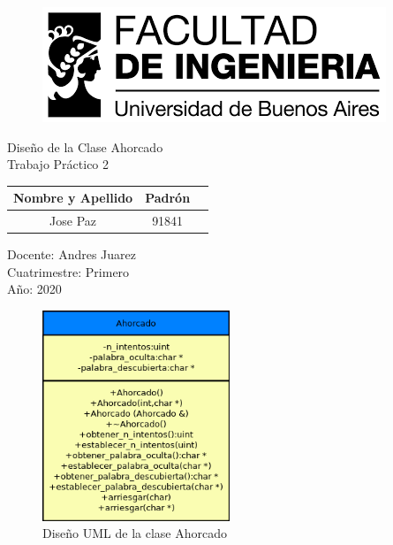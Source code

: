 \documentclass[a4paper,11pt]{article}
\begin{document}
\marginsize{2cm}{2cm}{2cm}{2cm}
\renewcommand\contentsname{Indice}
\renewcommand{\footrulewidth}{0.4pt}
\renewcommand{\headrulewidth}{0.4pt}

\pagestyle{empty}

\begin{figure}
  \centering
    \includegraphics{logo.png}
\end{figure}

\vfill
\vspace{4cm}
\vspace{4cm}
\vspace{4cm}
\begin{center}
	\Huge{Diseño de la Clase Ahorcado}\\
	\Huge{Trabajo Práctico 2}\\
\end{center}
\vspace{4cm}


\begin{center}
	\begin{tabular}{|c|c|c|}
		\hline
		\textbf{Nombre y Apellido}  & \textbf{Padrón}\\
		\hline
		 Jose Paz & 91841   \\
		\hline
	\end{tabular}
\end{center}

\vfill 

\begin{flushleft}
	\Large{Docente: Andres Juarez}\\
	\Large{Cuatrimestre: Primero}\\
	\Large{Año: 2020}\\
\end{flushleft}


\newpage

\begin{figure}
  \centering
    \includegraphics[width=0.5\textwidth]{Ahorcado_UML.png}
  \caption{Diseño UML de la clase Ahorcado}
  \label{fig:disenio}
\end{figure}
\end{document}

